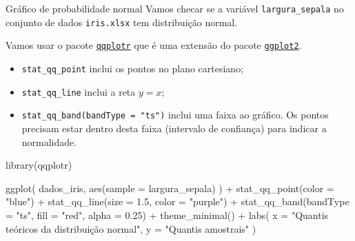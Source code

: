 \documentclass[
  10pt,
  ignorenonframetext,
]{beamer}
\newenvironment{Shaded}{\begin{snugshade}}{\end{snugshade}}
\newcommand{\AttributeTok}[1]{\textcolor[rgb]{0.40,0.45,0.13}{#1}}
\newcommand{\FloatTok}[1]{\textcolor[rgb]{0.68,0.00,0.00}{#1}}
\newcommand{\FunctionTok}[1]{\textcolor[rgb]{0.28,0.35,0.67}{#1}}
\newcommand{\NormalTok}[1]{\textcolor[rgb]{0.00,0.23,0.31}{#1}}
\newcommand{\SpecialCharTok}[1]{\textcolor[rgb]{0.37,0.37,0.37}{#1}}
\newcommand{\StringTok}[1]{\textcolor[rgb]{0.13,0.47,0.30}{#1}}
\providecommand{\tightlist}{%
  \setlength{\itemsep}{0pt}\setlength{\parskip}{0pt}}\usepackage{longtable,booktabs,array}
\begin{document}
\begin{frame}[fragile]{Gráfico de probabilidade normal}
\protect\hypertarget{gruxe1fico-de-probabilidade-normal}{}
Vamos checar se a variável \texttt{largura\_sepala} no conjunto de dados
\texttt{iris.xlsx} tem distribuição normal.

Vamos usar o pacote
\href{https://aloy.github.io/qqplotr/}{\texttt{qqplotr}} que é uma
extensão do pacote
\href{https://ggplot2.tidyverse.org/index.html}{\texttt{ggplot2}}.

\begin{itemize}
\tightlist
\item
  \texttt{stat\_qq\_point} inclui os pontos no plano cartesiano;
\item
  \texttt{stat\_qq\_line} inclui a reta \(y=x\);
\item
  \texttt{stat\_qq\_band(bandType\ =\ "ts")} inclui uma faixa ao
  gráfico. Os pontos precisam estar dentro desta faixa (intervalo de
  confiança) para indicar a normalidade.
\end{itemize}
\end{frame}

\begin{frame}[fragile]
\begin{Shaded}
\begin{Highlighting}[]
\FunctionTok{library}\NormalTok{(qqplotr)}

\FunctionTok{ggplot}\NormalTok{(}
\NormalTok{  dados\_iris,}
  \FunctionTok{aes}\NormalTok{(}\AttributeTok{sample =}\NormalTok{ largura\_sepala)}
\NormalTok{) }\SpecialCharTok{+}
  \FunctionTok{stat\_qq\_point}\NormalTok{(}\AttributeTok{color =} \StringTok{"blue"}\NormalTok{) }\SpecialCharTok{+}
  \FunctionTok{stat\_qq\_line}\NormalTok{(}\AttributeTok{size =} \FloatTok{1.5}\NormalTok{, }\AttributeTok{color =} \StringTok{"purple"}\NormalTok{) }\SpecialCharTok{+}
  \FunctionTok{stat\_qq\_band}\NormalTok{(}\AttributeTok{bandType =} \StringTok{"ts"}\NormalTok{, }\AttributeTok{fill =} \StringTok{"red"}\NormalTok{, }\AttributeTok{alpha =} \FloatTok{0.25}\NormalTok{) }\SpecialCharTok{+}
  \FunctionTok{theme\_minimal}\NormalTok{() }\SpecialCharTok{+}
  \FunctionTok{labs}\NormalTok{(}
    \AttributeTok{x =} \StringTok{"Quantis teóricos da distribuição normal"}\NormalTok{,}
    \AttributeTok{y =} \StringTok{"Quantis amostrais"}
\NormalTok{  )}
\end{Highlighting}
\end{Shaded}
\end{frame}
\end{document}
